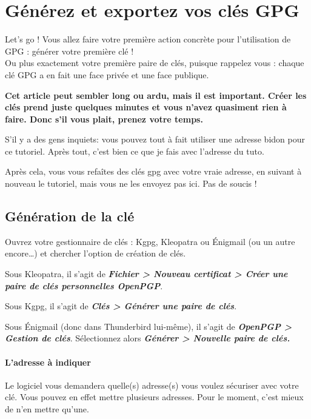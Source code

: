\chapter{Générez et exportez vos clés GPG}

Let's go ! Vous allez faire votre première action concrète pour
l'utilisation de GPG : générer votre première clé !\\Ou plus exactement
votre première paire de clés, puisque rappelez vous : chaque clé GPG a
en fait une face privée et une face publique.

\textbf{Cet article peut sembler long ou ardu, mais il est important.
Créer les clés prend juste quelques minutes et vous n'avez quasiment
rien à faire. Donc s'il vous plait, prenez votre temps.}

\begin{notice}
S'il y a des gens inquiets: vous pouvez tout à fait utiliser une adresse
bidon pour ce tutoriel. Après tout, c'est bien ce que je fais avec
l'adresse du tuto.

Après cela, vous vous refaîtes des clés gpg avec votre vraie adresse, en
suivant à nouveau le tutoriel, mais vous ne les envoyez pas ici. Pas de
soucis !
\end{notice}

\section{Génération de la clé}\label{guxe9nuxe9ration-de-la-cluxe9}

Ouvrez votre gestionnaire de clés : Kgpg, Kleopatra ou Énigmail (ou un
autre encore\ldots{}) et chercher l'option de création de clés.

Sous Kleopatra, il s'agit de \textbf{\emph{Fichier \textgreater{}
Nouveau certificat \textgreater{} Créer une paire de clés personnelles
OpenPGP}}.

Sous Kgpg, il s'agit de \textbf{\emph{Clés \textgreater{} Générer une
paire de clés}}.

Sous Énigmail (donc dans Thunderbird lui-même), il s'agit de
\textbf{\emph{OpenPGP \textgreater{} Gestion de clés}}. Sélectionnez
alors \textbf{\emph{Générer \textgreater{} Nouvelle paire de clés.}}

\subsubsection{L'adresse à indiquer}\label{ladresse-uxe0-indiquer}

Le logiciel vous demandera quelle(s) adresse(s) vous voulez sécuriser
avec votre clé. Vous pouvez en effet mettre plusieurs adresses. Pour le
moment, c'est mieux de n'en mettre qu'une.

